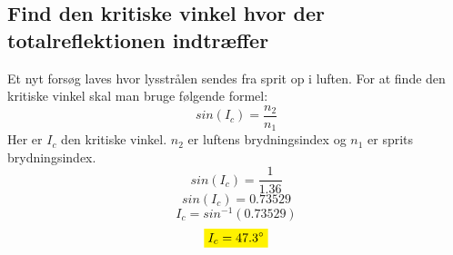 \subsection{Find den kritiske vinkel hvor der totalreflektionen indtræffer}
Et nyt forsøg laves hvor lysstrålen sendes fra sprit op i luften. 
For at finde den kritiske vinkel skal man bruge følgende formel:
\begin{equation*}
    sin(I_c)=\frac{n_2}{n_1}
\end{equation*}
Her er \begin{math}I_c\end{math} den kritiske vinkel. \begin{math}n_2\end{math} er luftens brydningsindex og \begin{math}n_1\end{math} er sprits brydningsindex.
\begin{equation*}
    sin(I_c)=\frac{1}{1.36}
\end{equation*}
\begin{equation*}
    sin(I_c)=0.73529
\end{equation*}
\begin{equation*}
    I_c=sin^{-1}(0.73529)
\end{equation*}
\begin{equation*}
    \mathcolorbox{yellow}{I_c=47.3^{\circ}}
\end{equation*}
\newpage